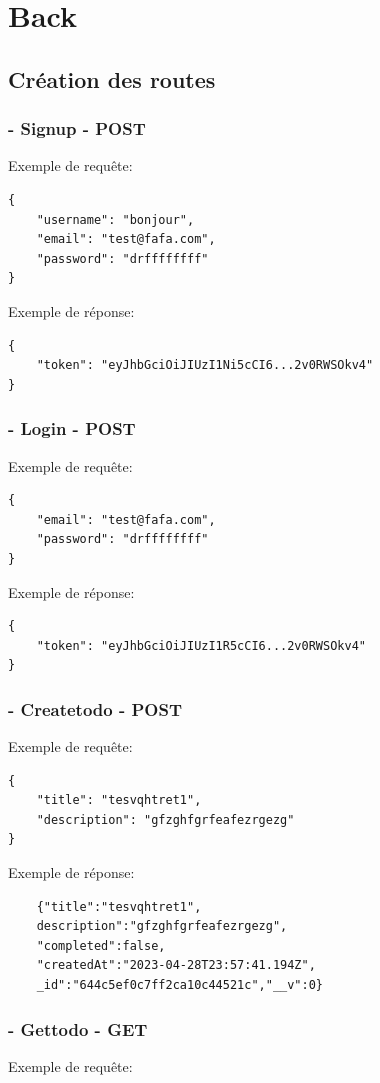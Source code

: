 \documentclass[a4paper,12pt]{report}
\begin{document}
\section{Back}
\subsection{Création des routes}
\subsubsection{- Signup - POST}
Exemple de requête:
\begin{lstlisting}
{
	"username": "bonjour",
	"email": "test@fafa.com",
	"password": "drffffffff"
}
\end{lstlisting}

Exemple de réponse:
\begin{lstlisting}
{
	"token": "eyJhbGciOiJIUzI1Ni5cCI6...2v0RWSOkv4"
}
\end{lstlisting}

\subsubsection{- Login - POST}
Exemple de requête:
\begin{lstlisting}
{
  	"email": "test@fafa.com",
  	"password": "drffffffff"
}
\end{lstlisting}

Exemple de réponse:
\begin{lstlisting}
{
	"token": "eyJhbGciOiJIUzI1R5cCI6...2v0RWSOkv4"
}
\end{lstlisting}
\subsubsection{- Createtodo - POST}
Exemple de requête:
\begin{lstlisting}
{
	"title": "tesvqhtret1",
	"description": "gfzghfgrfeafezrgezg"
}
\end{lstlisting}

Exemple de réponse:
\begin{lstlisting}
	{"title":"tesvqhtret1",
	description":"gfzghfgrfeafezrgezg",
	"completed":false,
	"createdAt":"2023-04-28T23:57:41.194Z",
	_id":"644c5ef0c7ff2ca10c44521c","__v":0}
\end{lstlisting}

\subsubsection{- Gettodo - GET}
Exemple de requête:
\end{document}
